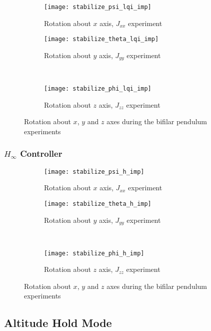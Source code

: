 \begin{figure}[H]
\begin{subfigure}{.5\linewidth}
\centering
\texttt{[image: stabilize\_psi\_lqi\_imp]}
\caption{Rotation about $x$ axis, $J_{xx}$ experiment}
\label{fig:stabilize_psi_lqi_imp}
\end{subfigure}%
\begin{subfigure}{.5\linewidth}
\centering
\texttt{[image: stabilize\_theta\_lqi\_imp]}
\caption{Rotation about $y$ axis, $J_{yy}$ experiment}
\label{fig:stabilize_theta_lqi_imp}
\end{subfigure}\\[1ex]
\begin{subfigure}{\linewidth}
\centering
\texttt{[image: stabilize\_phi\_lqi\_imp]}
\caption{Rotation about $z$ axis, $J_{zz}$ experiment}
\label{fig:stabilize_psi_lqi_imp}
\end{subfigure}
\caption{Rotation about $x$, $y$ and $z$ axes during the bifilar pendulum experiments}
\label{fig:stabilize_lqi_imp}
\end{figure}


\subsubsection{$H_\infty$ Controller}

\begin{figure}[H]
\begin{subfigure}{.5\linewidth}
\centering
\texttt{[image: stabilize\_psi\_h\_imp]}
\caption{Rotation about $x$ axis, $J_{xx}$ experiment}
\label{fig:stabilize_psi_h_imp}
\end{subfigure}%
\begin{subfigure}{.5\linewidth}
\centering
\texttt{[image: stabilize\_theta\_h\_imp]}
\caption{Rotation about $y$ axis, $J_{yy}$ experiment}
\label{fig:stabilize_theta_h_imp}
\end{subfigure}\\[1ex]
\begin{subfigure}{\linewidth}
\centering
\texttt{[image: stabilize\_phi\_h\_imp]}
\caption{Rotation about $z$ axis, $J_{zz}$ experiment}
\label{fig:stabilize_psi_h_imp}
\end{subfigure}
\caption{Rotation about $x$, $y$ and $z$ axes during the bifilar pendulum experiments}
\label{fig:stabilize_h_imp}
\end{figure}


\subsection{Altitude Hold Mode}

